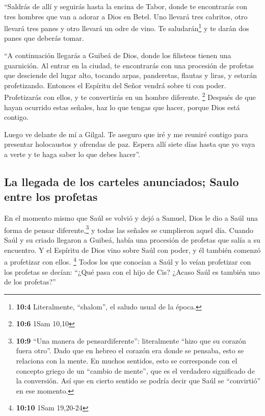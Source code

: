  ``Saldrás de allí y seguirás hasta la encina de Tabor,
donde te encontrarás con tres hombres que van a adorar a Dios en Betel.
Uno llevará tres cabritos, otro llevará tres panes y otro llevará un
odre de vino.  Te saludarán\footnote{\textbf{10:4}
  Literalmente, ``shalom'', el saludo usual de la época.} y te darán dos
panes que deberás tomar.

 ``A continuación llegarás a Guibeá de Dios, donde los
filisteos tienen una guarnición. Al entrar en la ciudad, te encontrarás
con una procesión de profetas que desciende del lugar alto, tocando
arpas, panderetas, flautas y liras, y estarán profetizando.
 Entonces el Espíritu del Señor vendrá sobre ti con poder.
Profetizarás con ellos, y te convertirás en un hombre diferente.
\footnote{\textbf{10:6} 1Sam 10,10}  Después de que hayan
ocurrido estas señales, haz lo que tengas que hacer, porque Dios está
contigo.

 Luego ve delante de mí a Gilgal. Te aseguro que iré y me
reuniré contigo para presentar holocaustos y ofrendas de paz. Espera
allí siete días hasta que yo vaya a verte y te haga saber lo que debes
hacer''.

\hypertarget{la-llegada-de-los-carteles-anunciados-saulo-entre-los-profetas}{%
\subsection{La llegada de los carteles anunciados; Saulo entre los
profetas}\label{la-llegada-de-los-carteles-anunciados-saulo-entre-los-profetas}}

 En el momento mismo que Saúl se volvió y dejó a Samuel,
Dios le dio a Saúl una forma de pensar diferente,\footnote{\textbf{10:9}
  ``Una manera de pensardiferente'': literalmente ``hizo que su corazón
  fuera otro''. Dado que en hebreo el corazón era donde se pensaba, esto
  se relaciona con la mente. En muchos sentidos, esto se corresponde con
  el concepto griego de un ``cambio de mente'', que es el verdadero
  significado de la conversión. Así que en cierto sentido se podría
  decir que Saúl se ``convirtió'' en ese momento.} y todas las señales
se cumplieron aquel día.  Cuando Saúl y su criado
llegaron a Guibeá, había una procesión de profetas que salía a su
encuentro. Y el Espíritu de Dios vino sobre Saúl con poder, y él también
comenzó a profetizar con ellos. \footnote{\textbf{10:10} 1Sam 19,20-24}
 Todos los que conocían a Saúl y lo veían profetizar con
los profetas se decían: ``¿Qué pasa con el hijo de Cis? ¿Acaso Saúl es
también uno de los profetas?''

